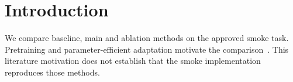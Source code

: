 \section{Introduction}
We compare baseline, main and ablation methods on the approved smoke task.
Pretraining and parameter-efficient adaptation motivate the comparison~\cite{devlin2019bert,hu2022lora}.
This literature motivation does not establish that the smoke implementation reproduces those methods.
